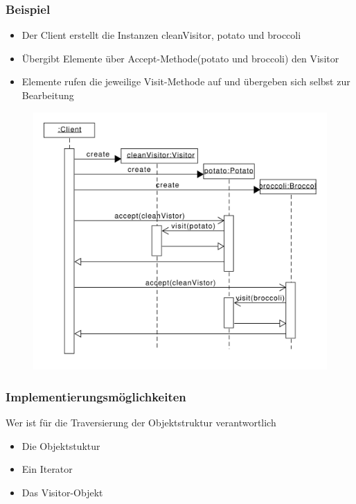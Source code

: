 \begin{frame}
	\frametitle{Beispiel}		
	\begin{itemize}
		\item Der Client erstellt die Instanzen cleanVisitor, potato und broccoli
		\item Übergibt Elemente über Accept-Methode(potato und broccoli) den Visitor
		\item Elemente rufen die jeweilige Visit-Methode auf und übergeben sich selbst zur Bearbeitung
	\end{itemize}	
  	\begin{figure}
		\includegraphics[scale=.29]{paper/visitor/visitor_sequenz}
		                                        
	\end{figure}
\end{frame}




\begin{frame}
	\frametitle{Implementierungsmöglichkeiten}
  \begin{block}{Wer ist für die Traversierung der Objektstruktur verantwortlich}
  	\begin{itemize}
  		\item Die Objektstuktur
  		\item Ein Iterator
  		\item Das Visitor-Objekt
  	\end{itemize}
  \end{block}
\end{frame}


